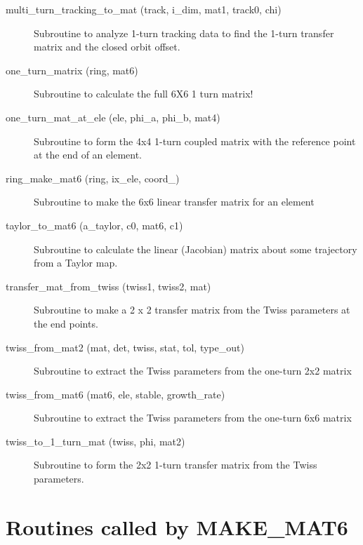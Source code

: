 \begin{description}
\item[multi\_turn\_tracking\_to\_mat (track, i\_dim, mat1, track0, chi)] \Newline
Subroutine to analyze 1-turn tracking data to find the 1-turn transfer matrix 
and the closed orbit offset.

\item[one\_turn\_matrix (ring, mat6)] \Newline
Subroutine to calculate the full 6X6 1 turn matrix! 

\item[one\_turn\_mat\_at\_ele (ele, phi\_a, phi\_b, mat4)] \Newline
Subroutine to form the 4x4 1-turn coupled matrix with the reference point 
at the end of an element. 

\item[ring\_make\_mat6 (ring, ix\_ele, coord\_)] \Newline
Subroutine to make the 6x6 linear transfer matrix for an element 

\item[taylor\_to\_mat6 (a\_taylor, c0, mat6, c1)] \Newline
Subroutine to calculate the linear (Jacobian) matrix about some trajectory from a Taylor map. 

\item[transfer\_mat\_from\_twiss (twiss1, twiss2, mat)] \Newline
Subroutine to make a 2 x 2 transfer matrix from the Twiss parameters at the end points. 

\item[twiss\_from\_mat2 (mat, det, twiss, stat, tol, type\_out)] \Newline
Subroutine to extract the Twiss parameters from the one-turn 2x2 matrix 

\item[twiss\_from\_mat6 (mat6, ele, stable, growth\_rate)] \Newline
Subroutine to extract the Twiss parameters from the one-turn 6x6 matrix 

\item[twiss\_to\_1\_turn\_mat (twiss, phi, mat2)] \Newline
Subroutine to form the 2x2 1-turn transfer matrix from the Twiss parameters. 

\end{description}

\section{Routines called by MAKE\_MAT6}
\label{r:mat6}


